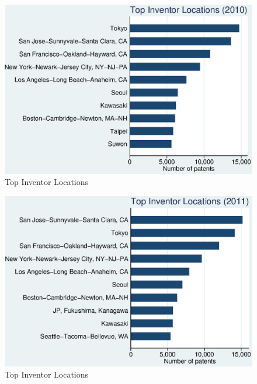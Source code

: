 \documentclass[12pt]{article}
\begin{document}
\begin{figure}[h]
\begin{centering}
  \includegraphics{2010top10}
  \caption{Top Inventor Locations}
  \label{fig:2010top10}
\end{centering}
\end{figure}

\begin{figure}[h]
\begin{centering}
  \includegraphics{2011top10}
  \caption{Top Inventor Locations}
  \label{fig:2011top10}
\end{centering}
\end{figure}
\end{document}

